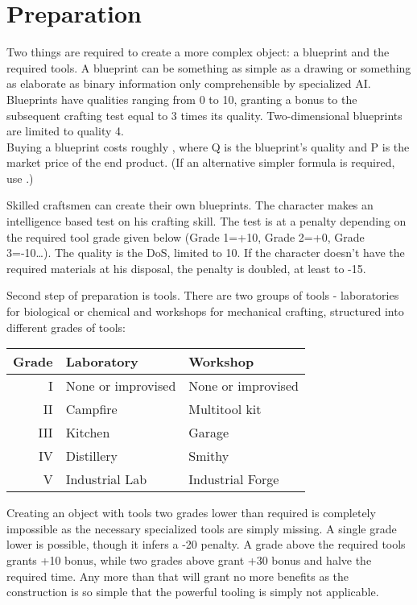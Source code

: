 \documentclass[12pt,a4paper,openany,usenames,dvipsnames]{book}
\begin{document}
	\chapter{Preparation}
	Two things are required to create a more complex object: a blueprint and the required tools.
	A blueprint can be something as simple as a drawing or something as elaborate as binary information only comprehensible by specialized AI. Blueprints have qualities ranging from 0 to 10, granting a bonus to the subsequent crafting test equal to 3 times its quality. Two-dimensional blueprints are limited to quality 4.\\
	Buying a blueprint costs roughly ,
		where Q is the blueprint’s quality and P is the market price of the end product.
	(If an alternative simpler formula is required, use .)\par
	Skilled craftsmen can create their own blueprints. The character makes an intelligence based test on his crafting skill. The test is at a penalty depending on the required tool grade given below (Grade 1=+10, Grade 2=+0, Grade 3=-10…). The quality is the DoS, limited to 10. If the character doesn’t have the required materials at his disposal, the penalty is doubled, at least to -15.\par
	Second step of preparation is tools.
	There are two groups of tools
		- laboratories for biological or chemical and workshops for mechanical crafting,
		structured into different grades of tools:
	\par
	\begin{tabularx}{\columnwidth}{r|XX}
		Grade & Laboratory & Workshop \\
		\hline
		I & None or improvised & None or improvised \\
		II & Campfire & Multitool kit \\
		III & Kitchen & Garage \\
		IV & Distillery & Smithy \\
		V & Industrial Lab & Industrial Forge
	\end{tabularx}
	\par
	Creating an object with tools two grades lower than required is completely impossible as the necessary specialized tools are simply missing. A single grade lower is possible, though it infers a -20 penalty. A grade above the required tools grants +10 bonus, while two grades above grant +30 bonus and halve the required time. Any more than that will grant no more benefits as the construction is so simple that the powerful tooling is simply not applicable.\\
\end{document}
